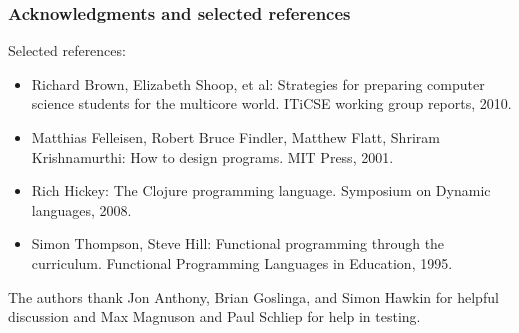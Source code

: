 \documentclass{beamer}
\begin{document}
\begin{frame}
\frametitle{Acknowledgments and selected references}
Selected references:
\begin{itemize}
\item Richard Brown, Elizabeth Shoop, et al: Strategies for preparing computer science students for the multicore world.  ITiCSE working group reports, 2010.
\item Matthias Felleisen, Robert Bruce Findler, Matthew Flatt, Shriram Krishnamurthi: How to design
programs. MIT Press, 2001.
\item Rich Hickey: The Clojure programming language. Symposium on
Dynamic languages, 2008. 
\item Simon Thompson, Steve Hill: Functional programming through the curriculum. Functional
Programming Languages in Education, 1995. 
\end{itemize}
The authors thank Jon Anthony, Brian Goslinga, and Simon Hawkin for helpful discussion and Max Magnuson and Paul Schliep for help in testing. 
\end{frame}
\end{document}
